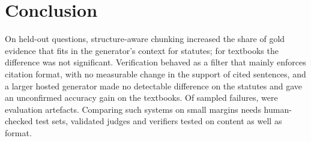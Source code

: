 \section{Conclusion}
\label{sec:conclusion}

On held-out questions, structure-aware chunking increased the share of gold evidence that fits in the generator's context for statutes; for textbooks the difference was not significant.
Verification behaved as a filter that mainly enforces citation format, with no measurable change in the support of cited sentences, and a larger hosted generator made no detectable difference on the statutes and gave an unconfirmed accuracy gain on the textbooks.
Of  sampled failures,  were evaluation artefacts.
Comparing such systems on small margins needs human-checked test sets, validated judges and verifiers tested on content as well as format.
